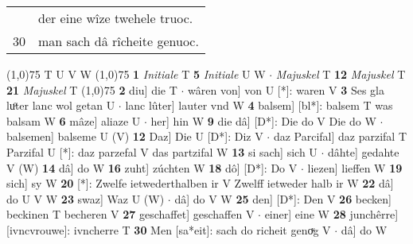 \documentclass[8pt,a4paper,notitlepage]{article}
\begin{document}
\begin{table}[ht]
\begin{minipage}[t]{0.5\linewidth}
\begin{tabular}{rl}
 & der eine wîze twehele truoc.\\ 
30 & man sach dâ rîcheite genuoc.\\ 
\end{tabular}
\scriptsize
\line(1,0){75} \newline
T U V W \newline
\line(1,0){75} \newline
\textbf{1} \textit{Initiale} T  \textbf{5} \textit{Initiale} U W   $\cdot$ \textit{Majuskel} T  \textbf{12} \textit{Majuskel} T  \textbf{21} \textit{Majuskel} T  \newline
\line(1,0){75} \newline
\textbf{2} diu] die T  $\cdot$ wâren von] von U [*]: waren V \textbf{3} Ses gla luͦter lanc wol getan U  $\cdot$ lanc lûter] lauter vnd W \textbf{4} balsem] [bl*]: balsem T was balsam W \textbf{6} mâze] aliaze U  $\cdot$ her] hin W \textbf{9} die dâ] [D*]: Die do V Die do W  $\cdot$ balsemen] balseme U (V) \textbf{12} Daz] Die U [D*]: Diz V  $\cdot$ daz Parcifal] daz parzifal T Parzifal U [*]: daz parzefal V das partzifal W \textbf{13} si sach] sich U  $\cdot$ dâhte] gedahte V (W) \textbf{14} dâ] do W \textbf{16} zuht] zúchten W \textbf{18} dô] [D*]: Do V  $\cdot$ liezen] lieffen W \textbf{19} sich] sy W \textbf{20} [*]: Zwelfe ietwederthalben ir V Zwelff ietweder halb ir W \textbf{22} dâ] do U V W \textbf{23} swaz] Waz U (W)  $\cdot$ dâ] do V W \textbf{25} den] [D*]: Den V \textbf{26} becken] beckinen T becheren V \textbf{27} geschaffet] geschaffen V  $\cdot$ einer] eine W \textbf{28} junchêrre] [ivncvrouwe]: ivncherre T \textbf{30} Men [sa*eit]: sach do richeit genoͮg V  $\cdot$ dâ] do W \newline
\end{minipage}
\end{table}
\end{document}
